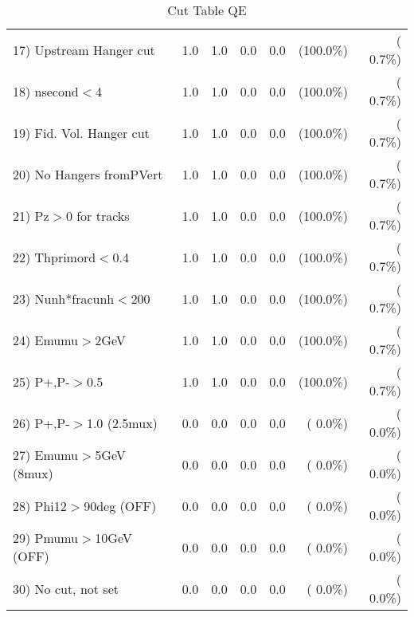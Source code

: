 \begin{table}[h!]
\begin{tabular}{||l||r|r|r|r|r|r||}
 17) Upstream Hanger cut  &          1.0 &          1.0 &          0.0 &          0.0 & (100.0\%) & (  0.7\%) \\
 18) nsecond$<$4          &          1.0 &          1.0 &          0.0 &          0.0 & (100.0\%) & (  0.7\%) \\
 19) Fid. Vol. Hanger cut &          1.0 &          1.0 &          0.0 &          0.0 & (100.0\%) & (  0.7\%) \\
 20) No Hangers fromPVert &          1.0 &          1.0 &          0.0 &          0.0 & (100.0\%) & (  0.7\%) \\
 21) Pz$>$0 for tracks    &          1.0 &          1.0 &          0.0 &          0.0 & (100.0\%) & (  0.7\%) \\
 22) Thprimord$<$0.4      &          1.0 &          1.0 &          0.0 &          0.0 & (100.0\%) & (  0.7\%) \\
 23) Nunh*fracunh$<$200   &          1.0 &          1.0 &          0.0 &          0.0 & (100.0\%) & (  0.7\%) \\
 24) Emumu$>$2GeV         &          1.0 &          1.0 &          0.0 &          0.0 & (100.0\%) & (  0.7\%) \\
 25) P+,P-$>$0.5          &          1.0 &          1.0 &          0.0 &          0.0 & (100.0\%) & (  0.7\%) \\
 26) P+,P-$>$1.0 (2.5mux) &          0.0 &          0.0 &          0.0 &          0.0 & (  0.0\%) & (  0.0\%) \\
 27) Emumu$>$5GeV  (8mux) &          0.0 &          0.0 &          0.0 &          0.0 & (  0.0\%) & (  0.0\%) \\
 28) Phi12$>$90deg  (OFF) &          0.0 &          0.0 &          0.0 &          0.0 & (  0.0\%) & (  0.0\%) \\
 29) Pmumu$>$10GeV  (OFF) &          0.0 &          0.0 &          0.0 &          0.0 & (  0.0\%) & (  0.0\%) \\
 30) No cut, not set      &          0.0 &          0.0 &          0.0 &          0.0 & (  0.0\%) & (  0.0\%) \\
 \hline
 \hline
 \end{tabular}
 \caption{Cut Table  QE       }
 \label{tab-cutheavy_neutrino_0.250}
 \end{table}
